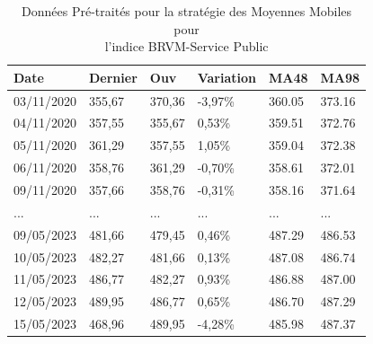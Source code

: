 \begin{samepage}
\begin{table}[ht]
\centering
\caption{Données Pré-traités pour la stratégie des Moyennes Mobiles pour \\l'indice BRVM-Service Public}\label{tab:multirow}
\begin{tabular}{p{2cm}p{2cm}p{2cm}p{2cm}p{2cm}p{1.5cm}}
	\hline
	Date 		&Dernier &Ouv 	&Variation	&MA48 		& MA98 \\ 
	\hline                                                                  
	03/11/2020	&355,67	&370,36	&-3,97\%	&360.05	&373.16 \\ 
	04/11/2020	&357,55	&355,67	&0,53\%		&359.51	&372.76 \\ 
	05/11/2020	&361,29	&357,55	&1,05\%		&359.04	&372.38 \\ 
	06/11/2020	&358,76	&361,29	&-0,70\%	&358.61	&372.01 \\ 
	09/11/2020	&357,66	&358,76	&-0,31\%	&358.16	&371.64 \\ 
	...			&...	&...	&...		&...		&... \\ 
	09/05/2023	&481,66	&479,45	&0,46\%		&487.29	&486.53  \\
	10/05/2023	&482,27	&481,66	&0,13\%		&487.08	&486.74  \\
	11/05/2023	&486,77	&482,27	&0,93\%		&486.88	&487.00  \\
	12/05/2023	&489,95	&486,77	&0,65\%		&486.70	&487.29  \\
	15/05/2023	&468,96	&489,95	&-4,28\%	&485.98	&487.37 \\
	\hline
\end{tabular}
\end{table}%
\end{samepage}

\newpage

